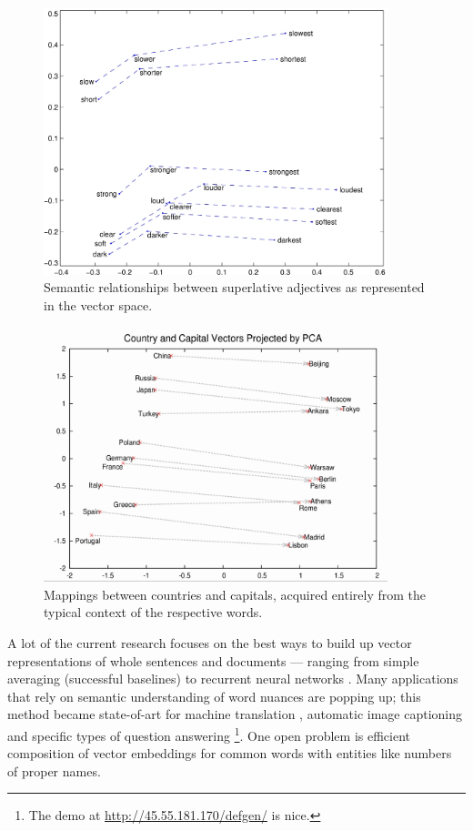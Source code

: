 \documentclass[11pt,a4paper]{article}
\begin{document}
\begin{figure}
	\centering
	\includegraphics[width=10cm]{comparative_superlative.jpg}
	\caption{Semantic relationships between superlative adjectives as represented in the vector space.}
	\label{fig:w2ver}
\end{figure}

\begin{figure}
	\centering
	\includegraphics[width=10cm]{capitals.png}
	\caption{Mappings between countries and capitals, acquired entirely from the typical context of the respective words.}
	\label{fig:w2vc}
\end{figure}

A lot of the current research focuses on the best ways to build up
vector representations of whole sentences and documents --- ranging
from simple averaging \cite{CNNSentClass,DefGen} (successful baselines)
to recurrent neural networks \cite{LISA,ShowAndTell}.
Many applications that rely on semantic understanding of word nuances
are popping up; this method became state-of-art for machine translation
\cite{LISA}, automatic image captioning \cite{ShowAndTell} and specific
types of question answering \cite{QANTA,DefGen,ReadAndComprehend}%
\footnote{The demo at \url{http://45.55.181.170/defgen/} is nice.}.
One open problem is efficient composition of vector embeddings for
common words with entities like numbers of proper names.
\end{document}
